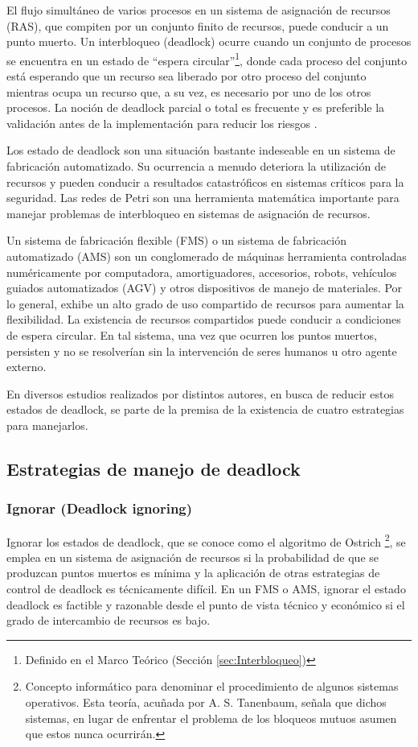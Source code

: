 \par El flujo simultáneo de varios procesos en un sistema de asignación de recursos (RAS), que compiten por un conjunto finito de recursos, puede conducir a un punto muerto. Un interbloqueo (deadlock) ocurre cuando un conjunto de procesos se encuentra en un estado de ``espera circular''\footnote{Definido en el Marco Teórico (Sección \ref{sec:Interbloqueo})}, donde cada proceso del conjunto está esperando que un recurso sea liberado por otro proceso del conjunto mientras ocupa un recurso que, a su vez, es necesario por uno de los otros procesos. La noción de deadlock parcial o total es frecuente y es preferible la validación antes de la implementación para reducir los riesgos \cite{LIU2016198}.

Los estado de deadlock son una situación bastante indeseable en un sistema de fabricación automatizado. Su ocurrencia a menudo deteriora la utilización de recursos y pueden conducir a resultados catastróficos en sistemas críticos para la seguridad. Las redes de Petri son una herramienta matemática importante para manejar problemas de interbloqueo en sistemas de asignación de recursos.

Un sistema de fabricación flexible (FMS) o un sistema de fabricación automatizado (AMS) son un conglomerado de máquinas herramienta controladas numéricamente por computadora, amortiguadores, accesorios, robots, vehículos guiados automatizados (AGV) y otros dispositivos de manejo de materiales. Por lo general, exhibe un alto grado de uso compartido de recursos para aumentar la flexibilidad. La existencia de recursos compartidos puede conducir a condiciones de espera circular. En tal sistema, una vez que ocurren los puntos muertos, persisten y no se resolverían sin la intervención de seres humanos u otro agente externo.

En diversos estudios realizados por distintos autores, en busca de reducir estos estados de deadlock, se parte de la premisa de la existencia de cuatro estrategias para manejarlos.

\subsection{Estrategias de manejo de deadlock}

\subsubsection{Ignorar (Deadlock ignoring)}
Ignorar los estados de deadlock, que se conoce como el algoritmo de Ostrich \footnote{Concepto informático para denominar el procedimiento de algunos sistemas operativos. Esta teoría, acuñada por A. S. Tanenbaum, señala que dichos sistemas, en lugar de enfrentar el problema de los bloqueos mutuos asumen que estos nunca ocurrirán.}, se emplea en un sistema de asignación de recursos si la probabilidad de que se produzcan puntos muertos es mínima y la aplicación de otras estrategias de control de deadlock es técnicamente difícil. En un FMS o AMS, ignorar el estado deadlock es factible y razonable desde el punto de vista técnico y económico si el grado de intercambio de recursos es bajo.

